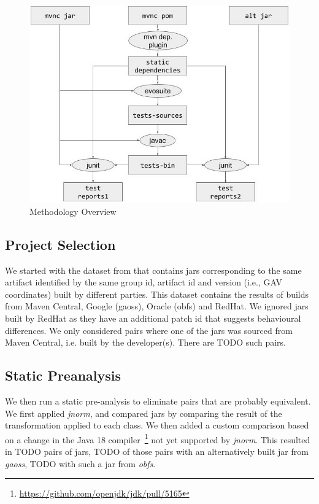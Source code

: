 \documentclass[conference]{IEEEtran}
\begin{document}
\begin{figure}[ht!]
	\centering
	\includegraphics[width=\columnwidth]{methodology.jpg}
	\caption{Methodology Overview \label{fig:methodology}}
\end{figure}


\subsection{Project Selection}

We started with the dataset from \cite{dietrich2024levelsbinaryequivalencecomparison} that contains jars corresponding to the same artifact identified by the same group id, artifact id and version (i.e., GAV coordinates) built by different parties. This dataset contains the results of builds from Maven Central, Google (gaoss), Oracle (obfs) and  RedHat. We ignored jars built by RedHat as they have an additional patch id that suggests behavioural differences.  We only considered pairs where one of the jars was sourced from Maven Central, i.e. built by the developer(s). There are TODO such pairs.


\subsection{Static Preanalysis}

We then run a static pre-analysis to eliminate pairs that are probably equivalent. We first applied \textit{jnorm}, and compared jars by comparing the result of the transformation applied to each class. We then added a custom comparison based on a change in the Java 18 compiler~\footnote{\url{https://github.com/openjdk/jdk/pull/5165}} not yet supported by \textit{jnorm}. This resulted in TODO pairs of jars, TODO of those pairs with an alternatively built jar from \textit{gaoss}, TODO with such a jar from \textit{obfs}.
\end{document}
